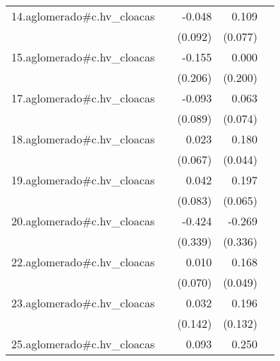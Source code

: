{\begin{longtable}{l*{4}{D{.}{.}{-1}}}
\addlinespace
14.aglomerado#c.hv\_cloacas&                     &      -0.048         &       0.109         &                     \\
            &                     &     (0.092)         &     (0.077)         &                     \\
\addlinespace
15.aglomerado#c.hv\_cloacas&                     &      -0.155         &       0.000         &                     \\
            &                     &     (0.206)         &     (0.200)         &                     \\
\addlinespace
17.aglomerado#c.hv\_cloacas&                     &      -0.093         &       0.063         &                     \\
            &                     &     (0.089)         &     (0.074)         &                     \\
\addlinespace
18.aglomerado#c.hv\_cloacas&                     &       0.023         &       0.180\sym{***}&                     \\
            &                     &     (0.067)         &     (0.044)         &                     \\
\addlinespace
19.aglomerado#c.hv\_cloacas&                     &       0.042         &       0.197\sym{**} &                     \\
            &                     &     (0.083)         &     (0.065)         &                     \\
\addlinespace
20.aglomerado#c.hv\_cloacas&                     &      -0.424         &      -0.269         &                     \\
            &                     &     (0.339)         &     (0.336)         &                     \\
\addlinespace
22.aglomerado#c.hv\_cloacas&                     &       0.010         &       0.168\sym{***}&                     \\
            &                     &     (0.070)         &     (0.049)         &                     \\
\addlinespace
23.aglomerado#c.hv\_cloacas&                     &       0.032         &       0.196         &                     \\
            &                     &     (0.142)         &     (0.132)         &                     \\
\addlinespace
25.aglomerado#c.hv\_cloacas&                     &       0.093         &       0.250\sym{***}&                     \\

\end{longtable}}
